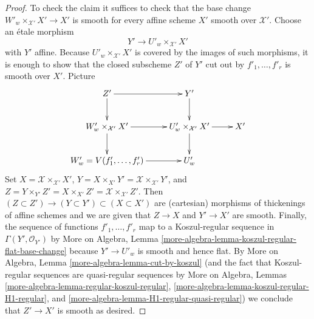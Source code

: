 \documentclass[10pt,a4paper]{amsart}
\theoremstyle{plain}
\theoremstyle{definition}
\theoremstyle{remark}
\numberwithin{equation}{subsection}
\begin{document}
\begin{proof}
\medskip\noindent
To check the claim it suffices to check that the base change
$W'_w \times_{\mathcal{X}'} X' \to X'$ is smooth for every
affine scheme $X'$ smooth over $\mathcal{X}'$. Choose an
\'etale morphism
$$
Y' \to U'_w \times_{\mathcal{X}'} X'
$$
with $Y'$ affine. Because $U'_w \times_{\mathcal{X}'} X'$ is covered
by the images of such morphisms, it is enough to show that the closed
subscheme $Z'$ of $Y'$ cut out by $f'_1, \ldots, f'_r$ is smooth over $X'$.
Picture
$$
\xymatrix{
Z' \ar[r] \ar[d] & Y' \ar[d] \\
W'_w \times_{\mathcal{X}'} X' \ar[d] \ar[r] &
U'_w \times_{\mathcal{X}'} X' \ar[d] \ar[r] & X' \\
W'_w = V(f'_1, \ldots, f'_r) \ar[r] & U'_w
}
$$
Set $X = \mathcal{X} \times_{\mathcal{X}'} X'$,
$Y = X \times_{X'} Y' = \mathcal{X} \times_{\mathcal{X}'} Y'$, and
$Z = Y \times_{Y'} Z' = X \times_{X'} Z' =
\mathcal{X} \times_{\mathcal{X}'} Z'$.
Then $(Z \subset Z') \to (Y \subset Y') \subset (X \subset X')$
are (cartesian) morphisms of thickenings of affine schemes and
we are given that $Z \to X$ and $Y' \to X'$ are smooth.
Finally, the sequence of functions $f'_1, \ldots, f'_r$
map to a Koszul-regular sequence in $\Gamma(Y', \mathcal{O}_{Y'})$ by
More on Algebra, Lemma \ref{more-algebra-lemma-koszul-regular-flat-base-change}
because $Y' \to U'_w$ is smooth and hence flat.
By More on Algebra, Lemma \ref{more-algebra-lemma-cut-by-koszul}
(and the fact that Koszul-regular sequences are quasi-regular sequences
by More on Algebra, Lemmas \ref{more-algebra-lemma-regular-koszul-regular},
\ref{more-algebra-lemma-koszul-regular-H1-regular}, and
\ref{more-algebra-lemma-H1-regular-quasi-regular})
we conclude that $Z' \to X'$ is smooth as desired.
\end{proof}
\end{document}
